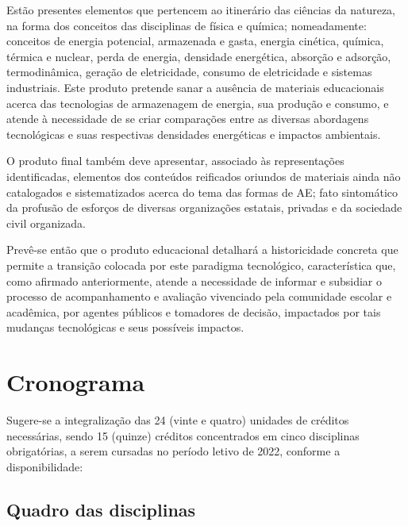 \documentclass[
  12pt,       %
  openright,      %
  twoside,      %
  a4paper,      %
  english,      %
  french,       %
  spanish,      %
  brazil        %
  ]{abntex2}
\begin{document}
Estão presentes elementos que pertencem ao itinerário das ciências da natureza, na forma dos conceitos das disciplinas de física e química; nomeadamente: conceitos de energia potencial, armazenada e gasta, energia cinética, química, térmica e nuclear, perda de energia, densidade energética, absorção e adsorção, termodinâmica, geração de eletricidade, consumo de eletricidade e sistemas industriais. Este produto pretende sanar a ausência de materiais educacionais acerca das tecnologias de armazenagem de energia, sua produção e consumo, e atende à necessidade de se criar comparações entre as diversas abordagens tecnológicas e suas respectivas densidades energéticas e impactos ambientais.

O produto final também deve apresentar, associado às representações identificadas, elementos dos conteúdos reificados oriundos de materiais ainda não catalogados e sistematizados acerca do tema das formas de AE; fato sintomático da profusão de esforços de diversas organizações estatais, privadas e da sociedade civil organizada.

Prevê-se então que o produto educacional detalhará a historicidade concreta que permite a transição colocada por este paradigma tecnológico, característica que, como afirmado anteriormente, atende a necessidade de informar e subsidiar o processo de acompanhamento e avaliação vivenciado pela comunidade escolar e acadêmica, por agentes públicos e tomadores de decisão, impactados por tais mudanças tecnológicas e seus possíveis impactos.





\chapter{Cronograma}

Sugere-se a integralização das 24 (vinte e quatro) unidades de créditos necessárias, sendo 15 (quinze) créditos concentrados em cinco disciplinas obrigatórias, a serem cursadas no período letivo de 2022, conforme a disponibilidade: 

\section{Quadro das disciplinas}
\end{document}
